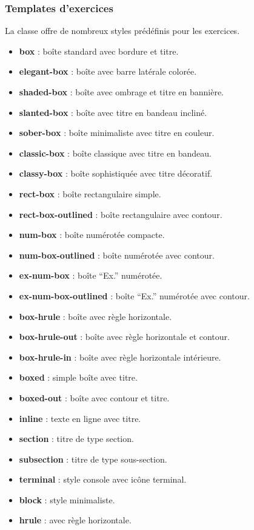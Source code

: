 \documentclass[
    french,
    margin=2cm
]{neoschool}
\begin{document}
\subsubsection{Templates d'exercices}

La classe offre de nombreux styles prédéfinis pour les exercices.

\begin{itemize}
\item \textbf{box} : boîte standard avec bordure et titre.
\item \textbf{elegant-box} : boîte avec barre latérale colorée.
\item \textbf{shaded-box} : boîte avec ombrage et titre en bannière.
\item \textbf{slanted-box} : boîte avec titre en bandeau incliné.
\item \textbf{sober-box} : boîte minimaliste avec titre en couleur.
\item \textbf{classic-box} : boîte classique avec titre en bandeau.
\item \textbf{classy-box} : boîte sophistiquée avec titre décoratif.
\item \textbf{rect-box} : boîte rectangulaire simple.
\item \textbf{rect-box-outlined} : boîte rectangulaire avec contour.
\item \textbf{num-box} : boîte numérotée compacte.
\item \textbf{num-box-outlined} : boîte numérotée avec contour.
\item \textbf{ex-num-box} : boîte ``Ex.'' numérotée.
\item \textbf{ex-num-box-outlined} : boîte ``Ex.'' numérotée avec contour.
\item \textbf{box-hrule} : boîte avec règle horizontale.
\item \textbf{box-hrule-out} : boîte avec règle horizontale et contour.
\item \textbf{box-hrule-in} : boîte avec règle horizontale intérieure.
\item \textbf{boxed} : simple boîte avec titre.
\item \textbf{boxed-out} : boîte avec contour et titre.
\item \textbf{inline} : texte en ligne avec titre.
\item \textbf{section} : titre de type section.
\item \textbf{subsection} : titre de type sous-section.
\item \textbf{terminal} : style console avec icône terminal.
\item \textbf{block} : style minimaliste.
\item \textbf{hrule} : avec règle horizontale.
\end{itemize}
\end{document}
